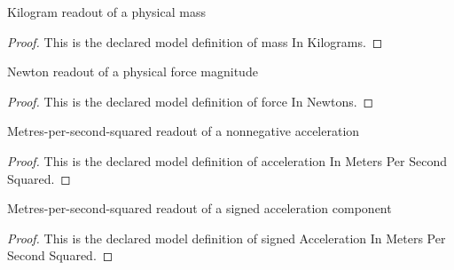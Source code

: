 \begin{definition}
  \label{def:physics:phyx-mini-0759:phyxminiproblems-problemphyxmini0759-massinkilograms}
  Kilogram readout of a physical mass
\end{definition}
\begin{proof}
  This is the declared model definition of mass In Kilograms.
\end{proof}
\begin{definition}
  \label{def:physics:phyx-mini-0759:phyxminiproblems-problemphyxmini0759-forceinnewtons}
  Newton readout of a physical force magnitude
\end{definition}
\begin{proof}
  This is the declared model definition of force In Newtons.
\end{proof}
\begin{definition}
  \label{def:physics:phyx-mini-0759:phyxminiproblems-problemphyxmini0759-accelerationinmeterspersecondsquared}
  Metres-per-second-squared readout of a nonnegative acceleration
\end{definition}
\begin{proof}
  This is the declared model definition of acceleration In Meters Per Second Squared.
\end{proof}
\begin{definition}
  \label{def:physics:phyx-mini-0759:phyxminiproblems-problemphyxmini0759-signedaccelerationinmeterspersecondsquared}
  Metres-per-second-squared readout of a signed acceleration component
\end{definition}
\begin{proof}
  This is the declared model definition of signed Acceleration In Meters Per Second Squared.
\end{proof}
